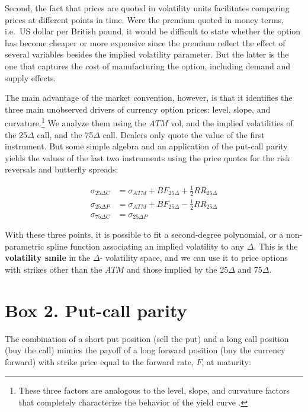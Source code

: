\documentclass[]{book}
\let\rmarkdownfootnote\footnote%
\def\footnote{\protect\rmarkdownfootnote}
\theoremstyle{definition}
\theoremstyle{definition}
\theoremstyle{definition}
\theoremstyle{remark}
\begin{document}
Second, the fact that prices are quoted in volatility units facilitates
comparing prices at different points in time. Were the premium quoted in
money terms, i.e.~US dollar per British pound, it would be difficult to
state whether the option has become cheaper or more expensive since the
premium reflect the effect of several variables besides the implied
volatility parameter. But the latter is the one that captures the cost
of manufacturing the option, including demand and supply effects.

The main advantage of the market convention, however, is that it
identifies the three main unobserved drivers of currency option prices:
level, slope, and curvature.\footnote{These three factors are analogous
  to the level, slope, and curvature factors that completely
  characterize the behavior of the yield curve
  \citep{Litterman-Scheinkman1991}.} We analyze them using the \(ATM\)
vol, and the implied volatilities of the 25\(\Delta\) call, and the
75\(\Delta\) call. Dealers only quote the value of the first instrument.
But some simple algebra and an application of the put-call parity yields
the values of the last two instruments using the price quotes for the
risk reversals and butterfly spreads:

\[
\begin{aligned}
  \sigma_{25\Delta C} &= \sigma_{ATM} + BF_{25\Delta} + \frac{1}{2} RR_{25\Delta}\\
  \sigma_{25\Delta P} &= \sigma_{ATM} + BF_{25\Delta} - \frac{1}{2} RR_{25\Delta}\\
  \sigma_{75\Delta C} &= \sigma_{25\Delta P}
\end{aligned}
\]

With these three points, it is possible to fit a second-degree
polynomial, or a non-parametric spline function associating an implied
volatility to any \(\Delta\). This is the \textbf{volatility smile} in
the \(\Delta\)- volatility space, and we can use it to price options
with strikes other than the \(ATM\) and those implied by the
25\(\Delta\) and 75\(\Delta\).

\section*{Box 2. Put-call parity}\label{box-2.-put-call-parity}

The combination of a short put position (sell the put) and a long call
position (buy the call) mimics the payoff of a long forward position
(buy the currency forward) with strike price equal to the forward rate,
\(F\), at maturity:
\end{document}
